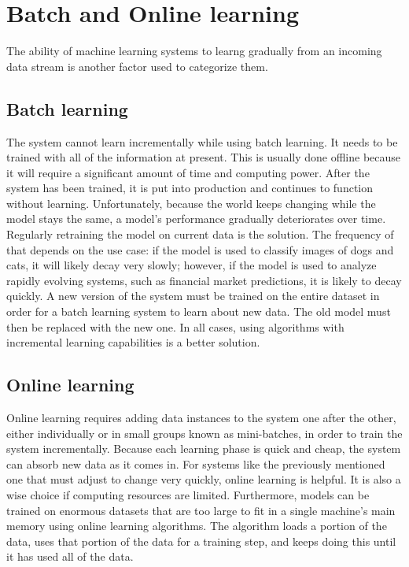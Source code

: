 \section{Batch and Online learning}
The ability of machine learning systems to learng gradually from an incoming data stream is another factor used to categorize them.

\subsection{Batch learning}
The system cannot learn incrementally while using batch learning. It needs to be trained with all of the information at present. This is usually done offline because it will require a significant amount of time and computing power. After the system has been trained, it is put into production and continues to function without learning. 
Unfortunately, because the world keeps changing while the model stays the same, a model's performance gradually deteriorates over time.
Regularly retraining the model on current data is the solution. The frequency of that depends on the use case: if the model is used to classify images of dogs and cats, it will likely decay very slowly; however, if the model is used to analyze rapidly evolving systems, such as financial market predictions, it is likely to decay quickly. 
A new version of the system must be trained on the entire dataset in order for a batch learning system to learn about new data. The old model must then be replaced with the new one. 
In all cases, using algorithms with incremental learning capabilities is a better solution. 

\subsection{Online learning}
Online learning requires adding data instances to the system one after the other, either individually or in small groups known as mini-batches, in order to train the system incrementally. 
Because each learning phase is quick and cheap, the system can absorb new data as it comes in. 
For systems like the previously mentioned one that must adjust to change very quickly, online learning is helpful.
It is also a wise choice if computing resources are limited.
Furthermore, models can be trained on enormous datasets that are too large to fit in a single machine's main memory using online learning algorithms. The algorithm loads a portion of the data, uses that portion of the data for a training step, and keeps doing this until it has used all of the data.
